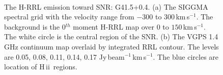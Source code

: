 \documentclass[manuscript]{aastex61}
\newcommand{\hii}{{\rm H\,}{{\sc ii}}}
\newcommand{\kms}{\,km\,s$^{-1}$}
\begin{document}
\begin{figure}[H]
	\centering
	\\
	\caption{The H-RRL emission toward SNR: G41.5+0.4.
	(a) The SIGGMA spectral grid with the velocity range from $-300$ to $300$\kms.
	The background is the 0$^{th}$ moment H-RRL map over $0$ to $150$\kms.
	The white circle is the central region of the SNR.
	(b) The VGPS 1.4 GHz continuum map overlaid by integrated RRL contour.
	The levels are 0.05, 0.08, 0.11, 0.14, 0.17 Jy\,beam$^{-1}$\kms.
	The blue circles are location of \hii\ regions.
	}
	\label{fig_snr-g415}
\end{figure}
\end{document}
